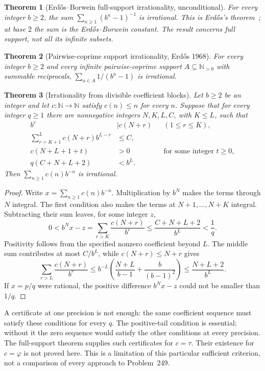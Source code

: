 \documentclass[11pt]{article}
\theoremstyle{plain}
\newtheorem{thm}{Theorem}[section]
\theoremstyle{definition}
\theoremstyle{remark}
\newcommand{\Npos}{\mathbb{N}_{>0}}
\begin{document}
\begin{thm}[Erd\H{o}s--Borwein full-support irrationality, unconditional]
\label{thm:full-support-catalogue}
For every integer $b\ge2$, the sum $\sum_{n\ge1}(b^n-1)^{-1}$
is irrational.  This is Erd\H{o}s's theorem~\cite{erdos1948}; at base
$2$ the sum is the Erd\H{o}s--Borwein constant.  The result concerns
full support, not all its infinite subsets.
\end{thm}

\begin{thm}[Pairwise-coprime support irrationality, Erd\H{o}s 1968]
\label{thm:pairwise-coprime}
For every integer $b\ge2$ and every infinite pairwise-coprime support
$A\subseteq\Npos$ with summable reciprocals, $\sum_{a\in A} 1/(b^a-1)$ is irrational.
\end{thm}

\begin{thm}[Irrationality from divisible coefficient blocks]
\label{thm:weighted-coeff-engine}
Let $b\ge2$ be an integer and let $c:\mathbb N\to\mathbb N$ satisfy
$c(n)\le n$ for every $n$.  Suppose that for every integer $q\ge1$
there are nonnegative integers $N,K,L,C$, with $K\le L$, such that
\[
 \begin{aligned}
 b^r&\mid c(N+r) &&(1\le r\le K),\\
 \sum_{r=K+1}^{L}c(N+r)b^{L-r}&\le C,\\
 c(N+L+1+t)&>0 &&\text{for some integer }t\ge0,\\
 q(C+N+L+2)&<b^L.
 \end{aligned}
\]
Then $\sum_{n\ge1}c(n)b^{-n}$ is irrational.
\end{thm}
\begin{proof}
Write $x=\sum_{n\ge1}c(n)b^{-n}$.  Multiplication by $b^N$
makes the terms through $N$ integral.  The first condition also
makes the terms at $N+1,\ldots,N+K$ integral.  Subtracting their
sum leaves, for some integer $z$,
\[
 0<b^Nx-z=\sum_{r>K}\frac{c(N+r)}{b^r}
 \le\frac{C+N+L+2}{b^L}<\frac1q.
\]
Positivity follows from the specified nonzero coefficient beyond $L$.
The middle sum contributes at most $C/b^L$, while $c(N+r)\le N+r$
gives
\[
 \sum_{r>L}\frac{c(N+r)}{b^r}
 \le b^{-L}\left(\frac{N+L}{b-1}+\frac{b}{(b-1)^2}\right)
 \le\frac{N+L+2}{b^L}.
\]
If $x=p/q$ were rational, the positive difference $b^Nx-z$
could not be smaller than $1/q$.
\end{proof}

A certificate at one precision is not enough: the same coefficient
sequence must satisfy these conditions for every $q$.  The positive-tail
condition is essential; without it the zero sequence would satisfy the
other conditions at every precision.  The full-support theorem supplies
such certificates for $c=\tau$.  Their existence for $c=\varphi$ is not
proved here.  This is a limitation of this particular sufficient
criterion, not a comparison of every approach to Problem~249.
\end{document}
